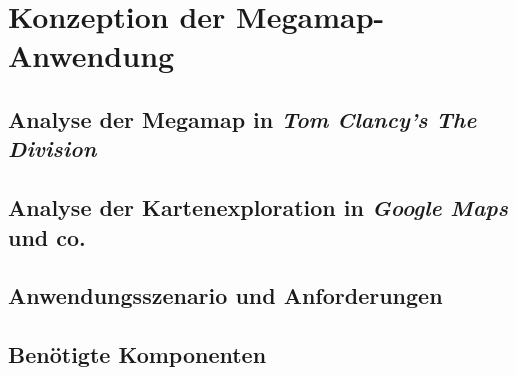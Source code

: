 \chapter{Konzeption der Megamap-Anwendung}

\section{Analyse der Megamap in \emph{Tom Clancy's The Division}}

\section{Analyse der Kartenexploration in \emph{Google Maps} und co.}

\section{Anwendungsszenario und Anforderungen}

\section{Benötigte Komponenten}

%
\cleardoublepage